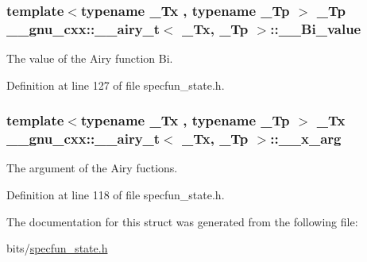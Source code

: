 \subsubsection[{\texorpdfstring{\+\_\+\+\_\+\+Bi\+\_\+value}{__Bi_value}}]{\setlength{\rightskip}{0pt plus 5cm}template$<$typename \+\_\+\+Tx , typename \+\_\+\+Tp $>$ \+\_\+\+Tp {\bf \+\_\+\+\_\+gnu\+\_\+cxx\+::\+\_\+\+\_\+airy\+\_\+t}$<$ \+\_\+\+Tx, \+\_\+\+Tp $>$\+::\+\_\+\+\_\+\+Bi\+\_\+value}\hypertarget{struct____gnu__cxx_1_1____airy__t_ab23888416f25e10da70692684cb586ec}{}\label{struct____gnu__cxx_1_1____airy__t_ab23888416f25e10da70692684cb586ec}


The value of the Airy function Bi. 



Definition at line 127 of file specfun\+\_\+state.\+h.

\subsubsection[{\texorpdfstring{\+\_\+\+\_\+x\+\_\+arg}{__x_arg}}]{\setlength{\rightskip}{0pt plus 5cm}template$<$typename \+\_\+\+Tx , typename \+\_\+\+Tp $>$ \+\_\+\+Tx {\bf \+\_\+\+\_\+gnu\+\_\+cxx\+::\+\_\+\+\_\+airy\+\_\+t}$<$ \+\_\+\+Tx, \+\_\+\+Tp $>$\+::\+\_\+\+\_\+x\+\_\+arg}\hypertarget{struct____gnu__cxx_1_1____airy__t_ad9cdd72baf6f12cd65fcb099350a727f}{}\label{struct____gnu__cxx_1_1____airy__t_ad9cdd72baf6f12cd65fcb099350a727f}


The argument of the Airy fuctions. 



Definition at line 118 of file specfun\+\_\+state.\+h.



The documentation for this struct was generated from the following file\+:\begin{DoxyCompactItemize}
\item 
bits/\hyperlink{specfun__state_8h}{specfun\+\_\+state.\+h}\end{DoxyCompactItemize}
